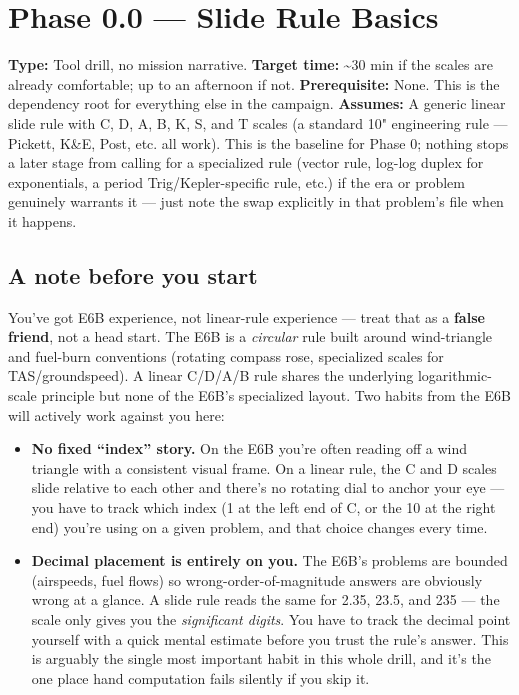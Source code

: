 \documentclass[
  10pt,
]{article}
\author{}
\date{}
\providecommand{\tightlist}{%
  \setlength{\itemsep}{0pt}\setlength{\parskip}{0pt}}
\begin{document}
\hypertarget{phase-0.0-slide-rule-basics}{%
\section{Phase 0.0 --- Slide Rule
Basics}\label{phase-0.0-slide-rule-basics}}

\textbf{Type:} Tool drill, no mission narrative. \textbf{Target time:}
\textasciitilde30 min if the scales are already comfortable; up to an
afternoon if not. \textbf{Prerequisite:} None. This is the dependency
root for everything else in the campaign. \textbf{Assumes:} A generic
linear slide rule with C, D, A, B, K, S, and T scales (a standard 10"
engineering rule --- Pickett, K\&E, Post, etc. all work). This is the
baseline for Phase 0; nothing stops a later stage from calling for a
specialized rule (vector rule, log-log duplex for exponentials, a period
Trig/Kepler-specific rule, etc.) if the era or problem genuinely
warrants it --- just note the swap explicitly in that problem's file
when it happens.

\hypertarget{a-note-before-you-start}{%
\subsection{A note before you start}\label{a-note-before-you-start}}

You've got E6B experience, not linear-rule experience --- treat that as
a \textbf{false friend}, not a head start. The E6B is a \emph{circular}
rule built around wind-triangle and fuel-burn conventions (rotating
compass rose, specialized scales for TAS/groundspeed). A linear C/D/A/B
rule shares the underlying logarithmic-scale principle but none of the
E6B's specialized layout. Two habits from the E6B will actively work
against you here:

\begin{itemize}
\tightlist
\item
  \textbf{No fixed ``index'' story.} On the E6B you're often reading off
  a wind triangle with a consistent visual frame. On a linear rule, the
  C and D scales slide relative to each other and there's no rotating
  dial to anchor your eye --- you have to track which index (1 at the
  left end of C, or the 10 at the right end) you're using on a given
  problem, and that choice changes every time.
\item
  \textbf{Decimal placement is entirely on you.} The E6B's problems are
  bounded (airspeeds, fuel flows) so wrong-order-of-magnitude answers
  are obviously wrong at a glance. A slide rule reads the same for 2.35,
  23.5, and 235 --- the scale only gives you the \emph{significant
  digits}. You have to track the decimal point yourself with a quick
  mental estimate before you trust the rule's answer. This is arguably
  the single most important habit in this whole drill, and it's the one
  place hand computation fails silently if you skip it.
\end{itemize}
\end{document}

